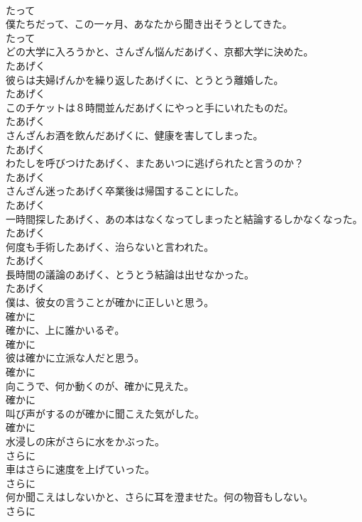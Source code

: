 \documentclass[8pt]{extreport}
\begin{document}
\begin{CJK}{UTF8}{min}
\\	たって
\\	僕たちだって、この一ヶ月、あなたから聞き出そうとしてきた。	
\\	たって
\\	どの大学に入ろうかと、さんざん悩んだあげく、京都大学に決めた。	
\\	たあげく
\\	彼らは夫婦げんかを繰り返したあげくに、とうとう離婚した。	
\\	たあげく
\\	このチケットは８時間並んだあげくにやっと手にいれたものだ。	
\\	たあげく
\\	さんざんお酒を飲んだあげくに、健康を害してしまった。	
\\	たあげく
\\	わたしを呼びつけたあげく、またあいつに逃げられたと言うのか？	
\\	たあげく
\\	さんざん迷ったあげく卒業後は帰国することにした。	
\\	たあげく
\\	一時間探したあげく、あの本はなくなってしまったと結論するしかなくなった。	
\\	たあげく
\\	何度も手術したあげく、治らないと言われた。	
\\	たあげく
\\	長時間の議論のあげく、とうとう結論は出せなかった。	
\\	たあげく
\\	僕は、彼女の言うことが確かに正しいと思う。	
\\	確かに
\\	確かに、上に誰かいるぞ。	
\\	確かに
\\	彼は確かに立派な人だと思う。	
\\	確かに
\\	向こうで、何か動くのが、確かに見えた。	
\\	確かに
\\	叫び声がするのが確かに聞こえた気がした。	
\\	確かに
\\	水浸しの床がさらに水をかぶった。	
\\	さらに
\\	車はさらに速度を上げていった。	
\\	さらに
\\	何か聞こえはしないかと、さらに耳を澄ませた。何の物音もしない。	
\\	さらに

\end{CJK}
\end{document}
